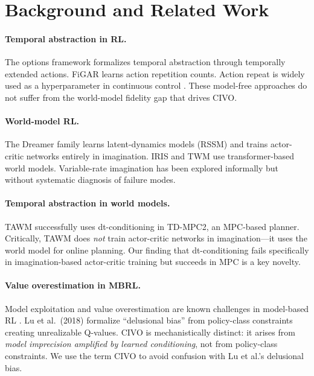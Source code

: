 \documentclass[10pt,letterpaper]{article}
\begin{document}
\section{Background and Related Work}

\paragraph{Temporal abstraction in RL.}
The options framework \citep{sutton1999options} formalizes temporal abstraction through temporally extended actions.
FiGAR \citep{sharma2017figar} learns action repetition counts.
Action repeat is widely used as a hyperparameter in continuous control \citep{hafner2023dreamerv3}.
These model-free approaches do not suffer from the world-model fidelity gap that drives CIVO.

\paragraph{World-model RL.}
The Dreamer family \citep{hafner2020dreamer,hafner2021dreamerv2,hafner2023dreamerv3} learns latent-dynamics models (RSSM) and trains actor-critic networks entirely in imagination.
IRIS \citep{micheli2023iris} and TWM \citep{robine2023twm} use transformer-based world models.
Variable-rate imagination has been explored informally but without systematic diagnosis of failure modes.

\paragraph{Temporal abstraction in world models.}
TAWM \citep{nhu2025tawm} successfully uses dt-conditioning in TD-MPC2, an MPC-based planner.
Critically, TAWM does \emph{not} train actor-critic networks in imagination---it uses the world model for online planning.
Our finding that dt-conditioning fails specifically in imagination-based actor-critic training but succeeds in MPC is a key novelty.

\paragraph{Value overestimation in MBRL.}
Model exploitation and value overestimation are known challenges in model-based RL \citep{janner2019mbpo}.
Lu et al.\ (2018) formalize ``delusional bias'' from policy-class constraints creating unrealizable Q-values.
CIVO is mechanistically distinct: it arises from \emph{model imprecision amplified by learned conditioning}, not from policy-class constraints.
We use the term CIVO to avoid confusion with Lu et al.'s delusional bias.
\end{document}

